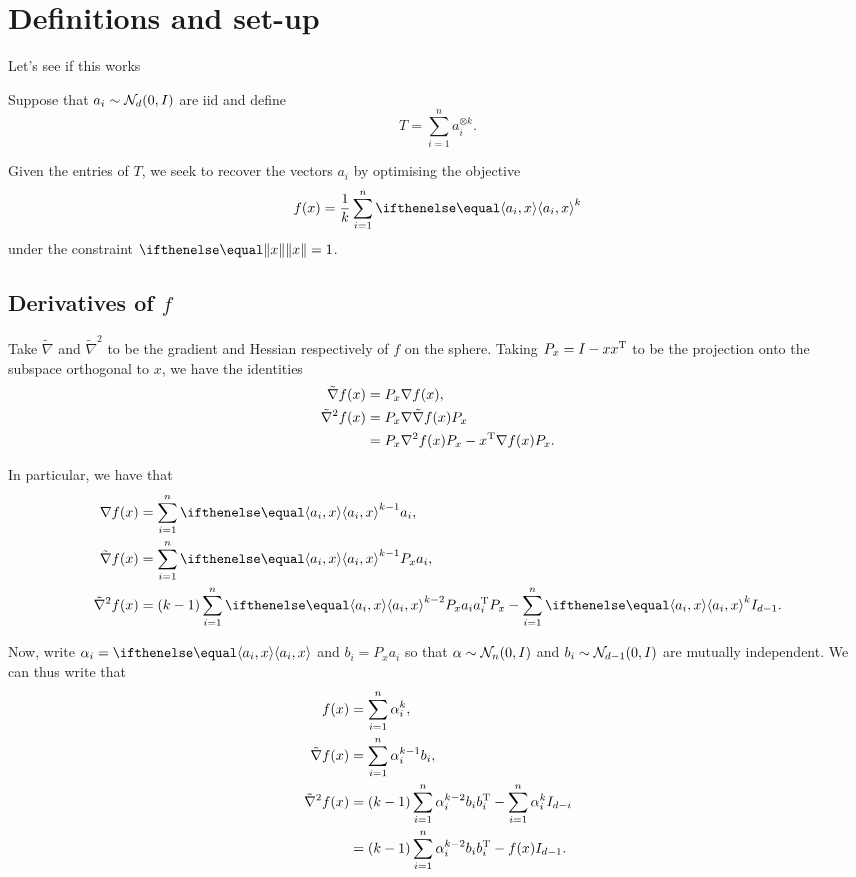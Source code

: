 \documentclass{hw-scrartcl}
\begin{document}
\maketitle
\section{Definitions and set-up}

Let's see if this works

Suppose that \(a_i \sim \mathcal{N}_d(0, I)\) are iid and define
\[
  T
  = \sum_{i=1}^n a_i^{\otimes k}.
\]

Given the entries of \(T\), we seek to recover the vectors \(a_i\) by optimising the objective
\[
  f(x)
  = \frac{1}{k}\sum_{i=1}^n \iprod{a_i}{x}^k
\]
under the constraint \(\norm{x} = 1\).

\subsection{Derivatives of \(f\)}
Take \(\tilde{\nabla}\) and \(\tilde{\nabla}^2\) to be the gradient and Hessian respectively of \(f\) on the sphere. Taking \(P_x = I - xx^{\mathrm{T}}\) to be the projection onto the subspace orthogonal to \(x\), we have the identities
\begin{align*}
  \tilde{\nabla} f(x)
  &= P_x \nabla f(x),\\
  \tilde{\nabla}^2 f(x)
  &= P_x \nabla \tilde{\nabla}f(x) P_x \\
  &= P_x \nabla^2 f(x) P_x - x^{\mathrm{T}} \nabla f(x) P_x.
\end{align*}

In particular, we have that
\begin{align*}
  \nabla f(x)
  &= \sum_{i=1}^n \iprod{a_i}{x}^{k-1} a_i,\\
  \tilde{\nabla} f(x)
  &= \sum_{i=1}^n \iprod{a_i}{x}^{k-1} P_x a_i,\\
  \tilde{\nabla}^2 f(x)
  &= (k-1) \sum_{i=1}^n \iprod{a_i}{x}^{k-2}P_x a_i a_i\transp P_x - \sum_{i=1}^n \iprod{a_i}{x}^k \Id_{d-1}.
\end{align*}

Now, write \(\alpha_i = \iprod{a_i}{x}\) and \(b_i = P_xa_i\) so that \(\alpha \sim \mathcal{N}_n(0, I)\) and \(b_i \sim \mathcal{N}_{d-1}(0, I)\) are mutually independent. We  can thus write that
\begin{align*}
  f(x)
  &= \sum_{i=1}^n \alpha_i^k, \\
  \tilde{\nabla} f(x)
  &= \sum_{i=1}^n \alpha_i^{k-1} b_i, \\
  \tilde{\nabla}^2 f(x)
  &= (k-1)\sum_{i=1}^n \alpha_i^{k-2} b_i b_i^{\mathrm{T}} - \sum_{i=1}^n \alpha_i^k I_{d-i} \\
  &= (k-1)\sum_{i=1}^n \alpha_i^{k-2} b_i b_i^{\mathrm{T}} - f(x)I_{d-1}.
\end{align*}
\end{document}
